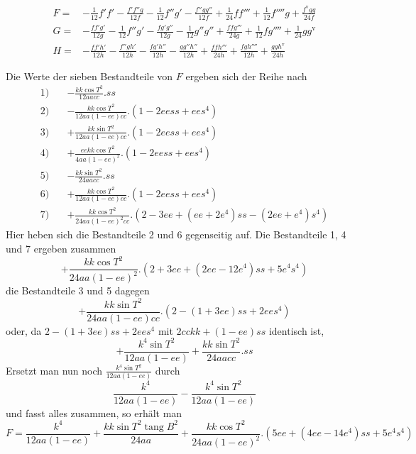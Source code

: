 %
\[
\begin{aligned}
F={}&-\tfrac1{12}f'f'-\frac{f'f''g}{12f}-\tfrac1{12}f''g'-\frac{f''gg''}{12f}+\tfrac1{24}ff'''+\tfrac1{12}f''''g+\frac{f^{\mathrm{v}}gg}{24f}\\
G={}&-\frac{ff'g'}{12g}-\tfrac1{12}f''g'-\frac{fg'g''}{12g}-\tfrac1{12}g''g''+\frac{ffg'''}{24g}+\tfrac1{12}fg''''+\tfrac1{24}gg^{\mathrm{v}}\\
H={}&-\frac{ff'h'}{12h}-\frac{f''gh'}{12h}-\frac{fg'h''}{12h}-\frac{gg''h''}{12h}+\frac{ffh'''}{24h}+\frac{fgh''''}{12h}+\frac{ggh^{\mathrm{v}}}{24h}
\end{aligned}
\]

Die Werte der sieben Bestandteile von \(F\) ergeben sich der Reihe nach
\[
\begin{aligned}
1)\quad&-\frac{kk\cos T^2}{12aacc}\mathord{.}ss\\
2)\quad&-\frac{kk\cos T^2}{12aa(1-ee)cc}\mathord{.}(1-2eess+ees^4)\\
3)\quad&+\frac{kk\sin T^2}{12aa(1-ee)cc}\mathord{.}(1-2eess+ees^4)\\
4)\quad&+\frac{eekk\cos T^2}{4aa(1-ee)^2}\mathord{.}(1-2eess+ees^4)\\
5)\quad&-\frac{kk\sin T^2}{24aacc}\mathord{.}ss\\
6)\quad&+\frac{kk\cos T^2}{12aa(1-ee)cc}\mathord{.}(1-2eess+ees^4)\\
7)\quad&+\frac{kk\cos T^2}{24aa(1-ee)^2cc}\mathord{.}(2-3ee+(ee+2e^4)ss-(2ee+e^4)s^4)
\end{aligned}
\]
Hier heben sich die Bestandteile 2 und 6 gegenseitig auf. Die Bestandteile 1, 4 und 7 ergeben zusammen
\[
+\frac{kk\cos T^2}{24aa(1-ee)^2}\mathord{.}(2+3ee+(2ee-12e^4)ss+5e^4s^4)
\]
die Bestandteile 3 und 5 dagegen
\[
+\frac{kk\sin T^2}{24aa(1-ee)cc}\mathord{.}(2-(1+3ee)ss+2ees^4)
\]
oder, da \(2-(1+3ee)ss+2ees^4\) mit \(2cckk+(1-ee)ss\) identisch ist,
\[
+\frac{k^4\sin T^2}{12aa(1-ee)}+\frac{kk\sin T^2}{24aacc}\mathord{.}ss
\]
Ersetzt man nun noch \(\frac{k^4\sin T^2}{12aa(1-ee)}\) durch
\[
\frac{k^4}{12aa(1-ee)}-\frac{k^4\sin T^2}{12aa(1-ee)}
\]
und fasst alles zusammen, so erhält man
\begingroup\fontsize{10}{12}\selectfont
\[
F=\frac{k^4}{12aa(1-ee)}+\frac{kk\sin T^2\operatorname{tang}B^2}{24aa}+\frac{kk\cos T^2}{24aa(1-ee)^2}\mathord{.}(5ee+(4ee-14e^4)ss+5e^4s^4)
\]
\endgroup
